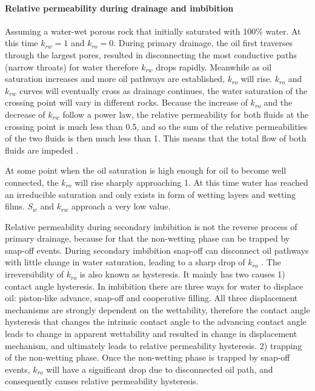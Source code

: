 \paragraph{Relative permeability during drainage and imbibition}
Assuming a water-wet porous rock that initially saturated with 100\% water. At this time $k_{rw}=1$ and $k_{ro}=0$. During primary drainage, the oil first traverses through the largest pores, resulted in disconnecting the most conductive paths (narrow throats) for water therefore $k_{rw}$ drops rapidly. Meanwhile as oil saturation increases and more oil pathways are established, $k_{ro}$ will rise. $k_{ro}$ and $k_{rw}$ curves will eventually cross as drainage continues, the water saturation of the crossing point will vary in different rocks. Because the increase of $k_{ro}$ and the decrease of $k_{rw}$ follow a power law, the relative permeability for both fluids at the crossing point is much less than 0.5, and so the sum of the relative permeabilities of the two fluids is then much less than 1. This means that the total flow of both fluids are impeded \citep{blunt2017multiphase}.

At some point when the oil saturation is high enough for oil to become well connected, the $k_{ro}$ will rise sharply approaching 1. At this time water has reached an irreducible saturation and only exists in form of wetting layers and wetting films. $S_w$ and $k_{rw}$ approach a very low value. 

Relative permeability during secondary imbibition is not the reverse process of primary drainage, because for that the non-wetting phase can be trapped by snap-off events. During secondary imbibition snap-off can disconnect oil pathways with little change in water saturation, leading to a sharp drop of $k_{ro}$ \citep{blunt2017multiphase}. The irreversibility of $k_{ro}$ is also known as hysteresis. It mainly has two causes \citep{spiteri2005relative} 1) contact angle hysteresis. In imbibition there are three ways for water to displace oil: piston-like advance, snap-off and cooperative filling. All three displacement mechanisms are strongly dependent on the wettability, therefore the contact angle hysteresis that changes the intrinsic contact angle to the advancing contact angle leads to change in apparent wettability and resulted in change in displacement mechanism, and ultimately leads to relative permeability hysteresis. 2) trapping of the non-wetting phase. Once the non-wetting phase is trapped by snap-off events, $k_{ro}$ will have a significant drop due to disconnected oil path, and consequently causes relative permeability hysteresis.

